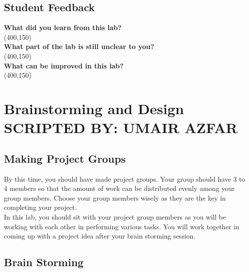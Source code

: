 \documentclass[11pt,fleqn]{book} %
\begin{document}
 \section{Student Feedback}
 \textbf{What did you learn from this lab?}\\ 
 \framebox(400,150){}\\
 \textbf{What part of the lab is still unclear to you?}\\
 \framebox(400,150){}\\
 \textbf{What can be improved in this lab?}\\ 
 \framebox(400,150){}\\

\newpage


\chapter{Brainstorming and Design \hspace{14mm} {\textsc{\small SCRIPTED BY: UMAIR AZFAR}}}

\section{Making Project Groups}

By this time, you should have made project groups. Your group should have 3 to 4 members so that the amount of work can be distributed evenly among your group members. Choose your group members wisely as they are the key in completing your project.\\

\noindent In this lab, you should sit with your project group members as you will be working with each other in performing various tasks. You will work together in coming up with a project idea after your brain storming session.

\section{Brain Storming}
\end{document}
